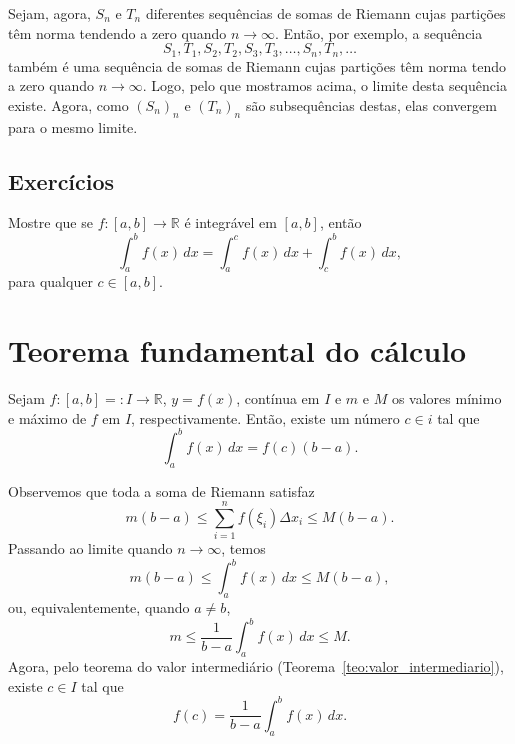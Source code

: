 \begin{dem}
Sejam, agora, $S_n$ e $T_n$ diferentes sequências de somas de Riemann cujas partições têm norma tendendo a zero quando $n\to\infty$. Então, por exemplo, a sequência
\begin{equation}
  S_1, T_1, S_2, T_2, S_3, T_3, \dotsc, S_n, T_n, \ldots
\end{equation}
também é uma sequência de somas de Riemann cujas partições têm norma tendo a zero quando $n\to\infty$. Logo, pelo que mostramos acima, o limite desta sequência existe. Agora, como $(S_n)_n$ e $(T_n)_n$ são subsequências destas, elas convergem para o mesmo limite.
\end{dem}

\subsection*{Exercícios}

\begin{exer}
  Mostre que se $f:[a, b]\to\mathbb{R}$ é integrável em $[a, b]$, então
  \begin{equation}
    \int_a^b f(x)\,dx = \int_a^c f(x)\,dx + \int_c^b f(x)\,dx,
  \end{equation}
para qualquer $c\in [a, b]$.
\end{exer}

\section{Teorema fundamental do cálculo}\label{cap_integracao_sec_tfc}

\begin{teo}\label{teo:da_media}
  Sejam $f:[a,b]=:I\to\mathbb{R}$, $y=f(x)$, contínua em $I$ e $m$ e $M$ os valores mínimo e máximo de $f$ em $I$, respectivamente. Então, existe um número $c\in i$ tal que
  \begin{equation}
    \int_a^b f(x)\,dx = f(c)(b-a).
  \end{equation}
\end{teo}
\begin{dem}
  Observemos que toda a soma de Riemann satisfaz
  \begin{equation}
    m(b-a) \leq \sum_{i=1}^n f(\xi_i)\Delta x_i \leq M(b-a).
  \end{equation}
Passando ao limite quando $n\to \infty$, temos
\begin{equation}
    m(b-a) \leq \int_a^b f(x)\,dx \leq M(b-a),
\end{equation}
ou, equivalentemente, quando $a\neq b$,
\begin{equation}
    m \leq \frac{1}{b-a}\int_a^b f(x)\,dx \leq M.
\end{equation}
Agora, pelo teorema do valor intermediário (Teorema~\ref{teo:valor_intermediario}), existe $c\in I$ tal que
\begin{equation}
  f(c) = \frac{1}{b-a}\int_a^b f(x)\,dx.
\end{equation}
\end{dem}


